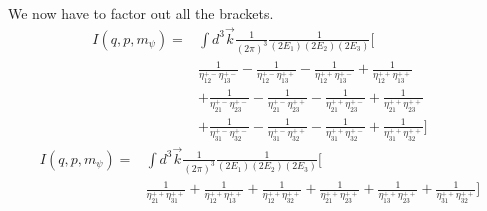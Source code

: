 We now have to factor out all the brackets.
\begin{align*}
I(q,p,m_\psi) =& \int d^3 \vec{k} \frac{1}{(2\pi)^3} \frac{1}{(2E_1)(2E_2)(2E_3)}\Bigg[\\
    &\frac{1}{\eta_{12}^{+-}\eta_{13}^{+-}} - \frac{1}{\eta_{12}^{+-}\eta_{13}^{++}} - \frac{1}{\eta_{12}^{++}\eta_{13}^{+-}} + \frac{1}{\eta_{12}^{++}\eta_{13}^{++}}\\
    &+ \frac{1}{\eta_{21}^{+-}\eta_{23}^{+-}} - \frac{1}{\eta_{21}^{+-}\eta_{23}^{++}} - \frac{1}{\eta_{21}^{++}\eta_{23}^{+-}} + \frac{1}{\eta_{21}^{++}\eta_{23}^{++}}\\
    &+ \frac{1}{\eta_{31}^{+-}\eta_{32}^{+-}} - \frac{1}{\eta_{31}^{+-}\eta_{32}^{++}} - \frac{1}{\eta_{31}^{++}\eta_{32}^{+-}} + \frac{1}{\eta_{31}^{++}\eta_{32}^{++}}
\Bigg]
\end{align*}
\begin{align*}
I(q,p,m_\psi) =& \int d^3 \vec{k} \frac{1}{(2\pi)^3} \frac{1}{(2E_1)(2E_2)(2E_3)}\Bigg[\\
      &\frac{1}{\eta_{21}^{++}\eta_{31}^{++}} + \frac{1}{\eta_{12}^{++}\eta_{13}^{++}}
    + \frac{1}{\eta_{12}^{++}\eta_{32}^{++}} + \frac{1}{\eta_{21}^{++}\eta_{23}^{++}}
    + \frac{1}{\eta_{13}^{++}\eta_{23}^{++}} + \frac{1}{\eta_{31}^{++}\eta_{32}^{++}}
\Bigg]
\end{align*}

